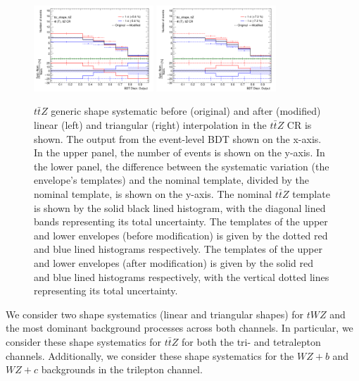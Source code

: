 \begin{figure}[h!]
  \includegraphics[width=0.4\textwidth]{figures/lep4_ttZ_4T_ttz_shape_20percent_linear.png}
  \includegraphics[width=0.4\textwidth]{figures/lep4_ttZ_4T_ttz_shape_20percent_triangular.png}
  \centering
  \label{fig:genericShapeSyst-example}
  \caption{$t\bar{t}Z$ generic shape systematic before (original) and after (modified) linear (left) and triangular (right) interpolation in the $t\bar{t}Z$ CR is shown. The output from the event-level BDT shown on the x-axis. In the upper panel, the number of events is shown on the y-axis. In the lower panel, the difference between the systematic variation (the envelope's templates) and the nominal template, divided by the nominal template, is shown on the y-axis. The nominal $t\bar{t}Z$ template is shown by the solid black lined histogram, with the diagonal lined bands representing its total uncertainty. The templates of the upper and lower envelopes (before modification) is given by the dotted red and blue lined histograms respectively. The templates of the upper and lower envelopes (after modification) is given by the solid red and blue lined histograms respectively, with the vertical dotted lines representing its total uncertainty. }
\end{figure}

We consider two shape systematics (linear and triangular shapes) for $tWZ$ and the most dominant background processes across both channels. In particular, we consider these shape systematics for $t\bar{t}Z$ for both the tri- and tetralepton channels. Additionally, we consider these shape systematics for the $WZ+b$ and $WZ+c$ backgrounds in the trilepton channel.


